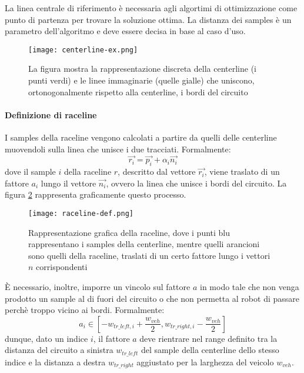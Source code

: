 La linea centrale di riferimento è necessaria agli algortimi di ottimizzazione come punto di partenza per
trovare la soluzione ottima.
La distanza dei samples è un parametro dell'algoritmo e deve essere decisa in base al caso d'uso.

\begin{figure}[h]
	\begin{center}
		\texttt{[image: centerline-ex.png]}
	\end{center}
	\caption{La figura mostra la rappresentazione discreta della centerline (i punti verdi) e le linee
	immaginarie (quelle gialle) che uniscono, ortonogonalmente rispetto alla centerline, i bordi
	del circuito}\label{fig:centerline-ex}
\end{figure}

\paragraph{Definizione di raceline}
I samples della raceline vengono calcolati a partire da quelli delle centerline muovendoli sulla linea
che unisce i due tracciati. Formalmente:
\[
	\overrightarrow{r_i} = \overrightarrow{p_i} + \alpha_i \overrightarrow{n_i}
\]
dove il sample $i$ della raceline $r$, descritto dal vettore $\overrightarrow{r_i}$, viene traslato di un
fattore $a_i$ lungo il vettore $\overrightarrow{n_i}$, ovvero la linea che unisce i bordi del circuito.
La figura \ref{fig:raceline-def} rappresenta graficamente questo processo.

\begin{figure}[h]
	\begin{center}
		\texttt{[image: raceline-def.png]}
	\end{center}
	\caption{Rappresentazione grafica della raceline, dove i punti blu rappresentano i samples della
	centerline, mentre quelli arancioni sono quelli della raceline, traslati di un certo fattore lungo i
	vettori $n$ corrispondenti}
	\label{fig:raceline-def}
\end{figure}

È necessario, inoltre, imporre un vincolo sul fattore $a$ in modo tale che non venga prodotto un sample
al di fuori del circuito o che non permetta al robot di passare perchè troppo vicino ai bordi.
Formalmente:
\begin{equation}
	a_i \in [ -w_{tr\_left, i} + \frac{w_{veh}}{2}, w_{tr\_right, i} - \frac{w_{veh}}{2}]
	\label{eq:a_constr}
\end{equation}
dunque, dato un indice $i$, il fattore $a$ deve rientrare nel range definito tra la distanza del circuito
a sinistra $w_{tr\_left}$ del sample della centerline dello stesso indice e la distanza a destra
$w_{tr\_right}$ aggiustato per la larghezza del veicolo $w_{veh}$.

